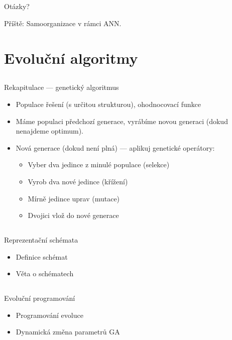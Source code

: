 \documentclass{beamer}
\begin{document}
\subsection{}
\begin{frame}{Otázky?}
\begin{center}
Příště: Samoorganizace v rámci ANN.
\end{center}
\end{frame}

\section{Evoluční algoritmy}

\subsection{}
\begin{frame}{Rekapitulace --- genetický algoritmus}
\begin{itemize}
\item Populace řešení (s určitou strukturou), ohodnocovací funkce
\item Máme populaci předchozí generace, vyrábíme novou generaci (dokud nenajdeme optimum).
\item Nová generace (dokud není plná) --- aplikuj genetické operátory:
\begin{itemize}
\item Vyber dva jedince z minulé populace (selekce)
\item Vyrob dva nové jedince (křížení)
\item Mírně jedince uprav (mutace)
\item Dvojici vlož do nové generace
\end{itemize}
\end{itemize}
\end{frame}

\subsection{}
\begin{frame}{Reprezentační schémata}
\begin{itemize}
\item Definice schémat
\item Věta o schématech
\end{itemize}
\end{frame}

\subsection{}
\begin{frame}{Evoluční programování}
\begin{itemize}
\item Programování evoluce
\item Dynamická změna parametrů GA
\end{itemize}
\end{frame}
\end{document}
